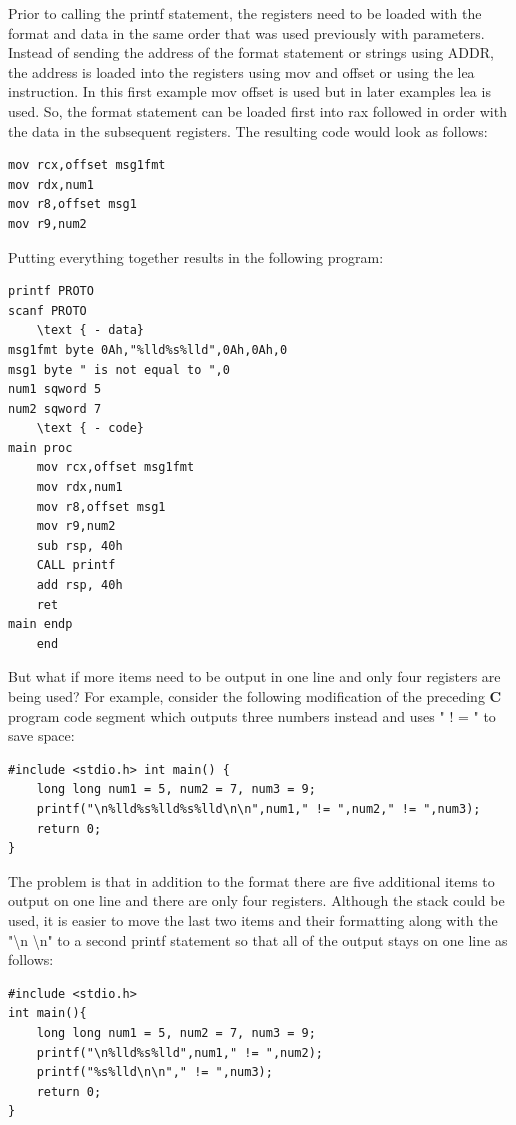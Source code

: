 \documentclass[10pt]{article}
\begin{document}
Prior to calling the printf statement, the registers need to be loaded with the format and data in the same order that was used previously with parameters. Instead of sending the address of the format statement or strings using ADDR, the address is loaded into the registers using mov and offset or using the lea instruction. In this first example mov offset is used but in later examples lea is used. So, the format statement can be loaded first into rax followed in order with the data in the subsequent registers. The resulting code would look as follows:

\begin{verbatim}
mov rcx,offset msg1fmt
mov rdx,num1
mov r8,offset msg1
mov r9,num2
\end{verbatim}

Putting everything together results in the following program:

\begin{verbatim}
printf PROTO
scanf PROTO
    \text { - data}
msg1fmt byte 0Ah,"%lld%s%lld",0Ah,0Ah,0
msg1 byte " is not equal to ",0
num1 sqword 5
num2 sqword 7
    \text { - code}
main proc
    mov rcx,offset msg1fmt
    mov rdx,num1
    mov r8,offset msg1
    mov r9,num2
    sub rsp, 40h
    CALL printf
    add rsp, 40h
    ret
main endp
    end
\end{verbatim}

But what if more items need to be output in one line and only four registers are being used? For example, consider the following modification of the preceding $\mathbf{C}$ program code segment which outputs three numbers instead and uses " ! = " to save space:

\begin{verbatim}
#include <stdio.h> int main() {
    long long num1 = 5, num2 = 7, num3 = 9;
    printf("\n%lld%s%lld%s%lld\n\n",num1," != ",num2," != ",num3);
    return 0;
}
\end{verbatim}

The problem is that in addition to the format there are five additional items to output on one line and there are only four registers. Although the stack could be used, it is easier to move the last two items and their formatting along with the "\textbackslash n \textbackslash n" to a second printf statement so that all of the output stays on one line as follows:

\begin{verbatim}
#include <stdio.h>
int main(){
    long long num1 = 5, num2 = 7, num3 = 9;
    printf("\n%lld%s%lld",num1," != ",num2);
    printf("%s%lld\n\n"," != ",num3);
    return 0;
}
\end{verbatim}
\end{document}
